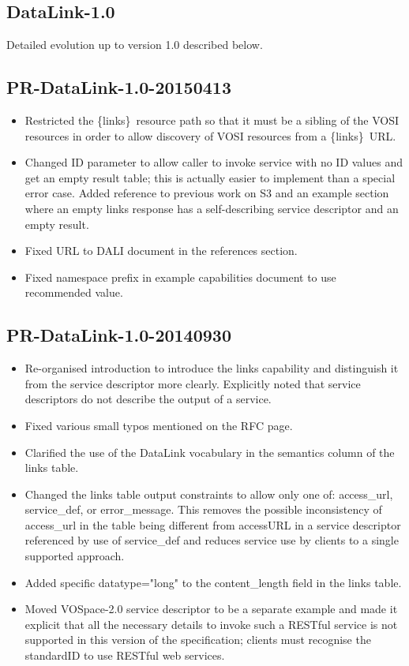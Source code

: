 \documentclass[11pt,a4paper]{ivoa}
\newcommand{\blinks}{\{links\}}
\newcommand{\attval}[2]{#1={\allowbreak}{"}#2{"}}
\begin{document}
\subsection{DataLink-1.0}

Detailed evolution up to version 1.0 described below.

\subsection{PR-DataLink-1.0-20150413}

\begin{itemize}
\item
Restricted the \blinks\ resource path so that it must be a sibling of
the VOSI resources in order to allow discovery of VOSI resources from
a \blinks\ URL.
\item
Changed ID parameter to allow caller to invoke service with no ID values
and get an empty result table; this is actually easier to implement
than a special error case. Added reference to previous work on S3 and
an example section where an empty links response has a self-describing
service descriptor and an empty result.
\item
Fixed URL to DALI document in the references section.
\item
Fixed namespace prefix in example capabilities document to use recommended
value.
\end{itemize}


\subsection{PR-DataLink-1.0-20140930}

\begin{itemize}
\item
Re-organised introduction to introduce the links capability and
distinguish it from the service descriptor more clearly. Explicitly
noted that service descriptors do not describe the output of a service.
\item
Fixed various small typos mentioned on the RFC page.
\item
Clarified the use of the DataLink vocabulary in the semantics column of
the links table.
\item
Changed the links table output constraints to allow only one of:
access\_url, service\_def, or error\_message. This removes the possible
inconsistency of access\_url in the table being different from accessURL
in a service descriptor referenced by use of service\_def and reduces
service use by clients to a single supported approach.
\item
Added specific \attval{datatype}{long} to the content\_length field in the
links table.
\item
Moved VOSpace-2.0 service descriptor to be a separate example and made
it explicit that all the necessary details to invoke such a RESTful
service is not supported in this version of the specification; clients
must recognise the standardID to use RESTful web services.
\end{itemize}
\end{document}
